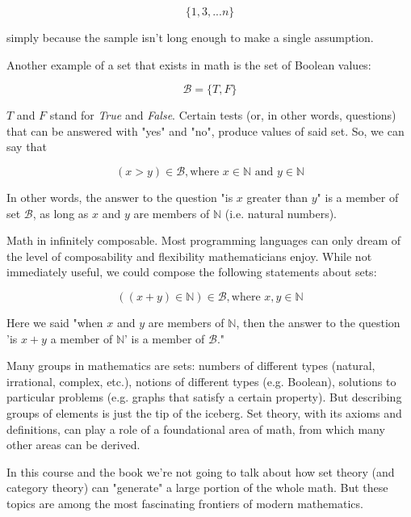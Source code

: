 \documentclass[12pt, a4paper, justified, notitlepage, sfsidenotes, notoc]{book}
\begin{document}
\begin{equation}
\{1, 3, ... n\}
\end{equation}

simply because the sample isn't long enough to make a single assumption.

Another example of a set that exists in math is the set of Boolean values:

\begin{equation}
\mathscr{B} = \{T, F\}
\end{equation}

\(T\) and \(F\) stand for \emph{True} and \emph{False}. Certain tests (or, in other words, questions) that can be answered with "yes" and "no", produce values of said set. So, we can say that

\begin{equation}
(x > y) \in \mathscr{B}, \textrm{where }  x \in \mathbb{N} \textrm{ and } y \in \mathbb{N}
\end{equation}

In other words, the answer to the question "is \(x\) greater than \(y\)" is a member of set \(\mathscr{B}\), as long as \(x\) and \(y\) are members of \(\mathbb{N}\) (i.e. natural numbers).

Math in infinitely composable. Most programming languages can only dream of the level of composability and flexibility mathematicians enjoy. While not immediately useful, we could compose the following statements about sets:

\begin{equation}
((x + y) \in \mathbb{N}) \in \mathscr{B}, \textrm{where }  x, y \in \mathbb{N}
\end{equation}

Here we said "when \(x\) and \(y\) are members of \(\mathbb{N}\), then the answer to the question 'is \(x + y\) a member of \(\mathbb{N}\)' is a member of \(\mathscr{B}\)."

Many groups in mathematics are sets: numbers of different types (natural, irrational, complex, etc.), notions of different types (e.g. Boolean), solutions to particular problems (e.g. graphs that satisfy a certain property). But describing groups of elements is just the tip of the iceberg. Set theory, with its axioms and definitions, can play a role of a foundational area of math, from which many other areas can be derived.

In this course and the book we're not going to talk about how set theory (and category theory) can "generate" a large portion of the whole math. But these topics are among the most fascinating frontiers of modern mathematics.
\end{document}
